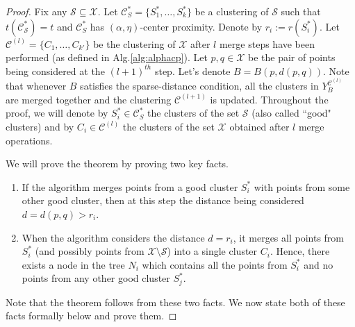 \documentclass[anon,12pt]{colt2016} %
\newcommand{\mc}{\mathcal}
\begin{document}
\begin{proof}
Fix any $\mc S \subseteq \mc X$. Let $\mc C^*_S = \{S_1^*, \ldots, S_k^*\}$ be a clustering of $\mc S$ such that $t(\mc C_{\mc S}^*) = t$ and $\mc C^*_S$ has $(\alpha, \eta)$-center proximity. Denote by $r_i := r(S_i^*)$. Let $\mc C^{(l)} = \{C_1, \ldots, C_{k'}\}$ be the clustering of $\mc X$ after $l$ merge steps have been performed (as defined in Alg.\ref{alg:alphacp}). Let $p, q \in \mc X$ be the pair of points being considered at the $(l+1)^{th}$ step. Let's denote $B = B(p, d(p, q))$. Note that whenever $B$ satisfies the sparse-distance condition, all the clusters in $Y_{B}^{{\mc C}^{(l)}}$ are merged together and the clustering $\mc C^{(l+1)}$ is updated. Throughout the proof, we will denote by $S_i^* \in \mc C^*_S$ the clusters of the set $\mc S$ (also called ``good" clusters) and by $C_i \in \mc C^{(l)}$ the clusters of the set $\mc X$ obtained after $l$ merge operations.

\noindent We will prove the theorem by proving two key facts.

\begin{enumerate}[nolistsep, noitemsep, label=\textbf{F.\arabic*}]
\renewcommand\labelitemi{$\diamond$}
\item \label{fact:1} If the algorithm merges points from a good cluster $S_i^*$ with points from some other good cluster,  then at this step the distance being considered $d = d(p,q) > r_i$.	
\item \label{fact:2} When the algorithm considers the distance $d = r_i$, it merges all points from $S_i^*$ (and possibly points from $\mc X\setminus \mc S$) into a single cluster $C_i$. Hence, there exists a node in the tree $N_i$ which contains all the points from $S_i^*$ and no points from any other good cluster $S_j^*$. 	
\end{enumerate}
Note that the theorem follows from these two facts. We now state both of these facts formally below and prove them.


\end{proof}
\end{document}
